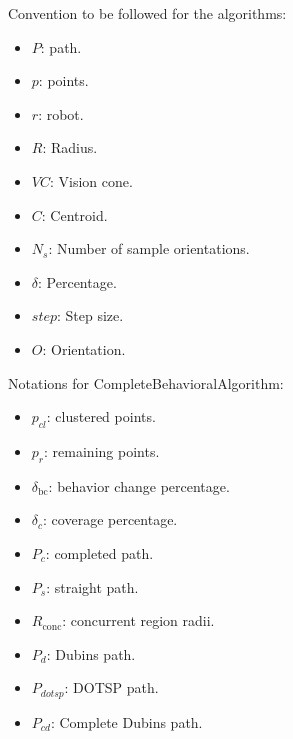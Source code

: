 Convention to be followed for the algorithms:
\begin{multicols}{2}
\begin{itemize}[noitemsep,topsep=0pt]
    \item $P$: path.
    \item $p$: points.
    \item $r$: robot.
    \item $R$: Radius.
    \item $VC$: Vision cone.
    \item $C$: Centroid.
    \item $N_s$: Number of sample orientations.
    \item $ \delta$: Percentage.
    \item $step$: Step size.
    \item $O$: Orientation.
\end{itemize}
\end{multicols}

\vspace{3mm}  

Notations for CompleteBehavioralAlgorithm:
\begin{multicols}{2}
\begin{itemize}[noitemsep,topsep=0pt]
    \item $p_{cl}$: clustered points.
    \item $p_r$: remaining points.
    \item $\delta_{\text{bc}}$: behavior change percentage.
    \item $\delta_c$: coverage percentage.
    \item $P_c$: completed path.
    \item $P_s$: straight path.
    \item $R_{\text{conc}}$: concurrent region radii.
    \item $P_d$: Dubins path.
    \item $P_{dotsp}$: DOTSP path.
    \item $P_{cd}$: Complete Dubins path.
\end{itemize}
\end{multicols}

